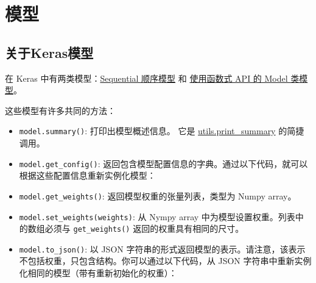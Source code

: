 \section{模型}\label{about-keras-models}
\subsection{关于Keras模型}
在 Keras 中有两类模型：\hyperref[sequential-api]{Sequential 顺序模型} 和
\hyperref[model-api]{使用函数式 API 的 Model 类模型}。

这些模型有许多共同的方法：

\begin{itemize}
\tightlist
\item
  \texttt{model.summary()}: 打印出模型概述信息。 它是
  \hyperref[print-summary]{utils.print\_summary} 的简捷调用。
\item
  \texttt{model.get\_config()}:
  返回包含模型配置信息的字典。通过以下代码，就可以根据这些配置信息重新实例化模型：
\end{itemize}

\begin{Shaded}
\begin{Highlighting}[]
\OperatorTok{=} 
\OperatorTok{=} 
\OperatorTok{=} 
\end{Highlighting}
\end{Shaded}

\begin{itemize}
\tightlist
\item
  \texttt{model.get\_weights()}: 返回模型权重的张量列表，类型为 Numpy
  array。
\item
  \texttt{model.set\_weights(weights)}: 从 Nympy array
  中为模型设置权重。列表中的数组必须与 \texttt{get\_weights()}
  返回的权重具有相同的尺寸。
\item
  \texttt{model.to\_json()}: 以 JSON
  字符串的形式返回模型的表示。请注意，该表示不包括权重，只包含结构。你可以通过以下代码，从
  JSON 字符串中重新实例化相同的模型（带有重新初始化的权重）：
\end{itemize}

\begin{Shaded}
\begin{Highlighting}[]
  

\OperatorTok{=} 
\OperatorTok{=} 
\end{Highlighting}
\end{Shaded}

